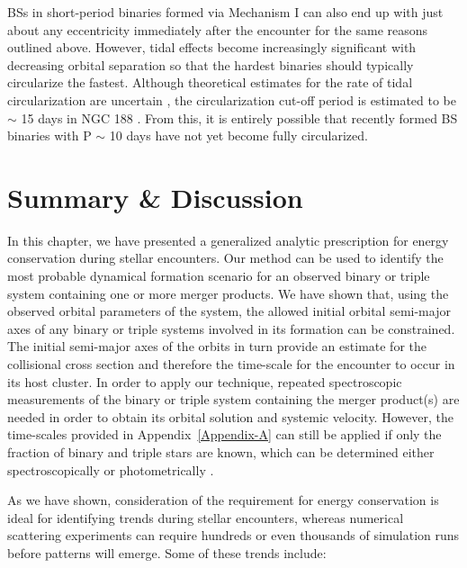 \begin{enumerate}
BSs in short-period binaries formed via Mechanism I can also end up
with just about any eccentricity immediately after the encounter for
the same reasons outlined above.  However, tidal effects become increasingly significant
with decreasing orbital separation so that the hardest binaries should
typically circularize the fastest.  Although theoretical estimates for
the rate of tidal circularization are uncertain \citep{meibom05},
the circularization cut-off period is estimated to be $\sim$ 15 days in NGC
188 \citep{mathieu04}.  From this, it is entirely possible that
recently formed BS 
binaries with P $\sim$ 10 days have not yet become fully
circularized.  

\end{enumerate}

\section{Summary \& Discussion} \label{discussion2}

In this chapter, we have presented a generalized analytic prescription
for energy conservation during stellar encounters.  Our method can be
used to identify the most probable
dynamical formation scenario for an observed binary or triple
system containing one or more merger products.  We have shown
that, using the observed 
orbital parameters of the system, the allowed initial orbital
semi-major axes of any binary or triple
systems involved in its formation can be constrained.  The
initial semi-major axes of the orbits in turn provide an 
estimate for the collisional cross section and therefore the time-scale
for the encounter to occur in its host cluster.  In order to apply our
technique, repeated spectroscopic measurements of the binary or triple
system containing the merger product(s) are needed in order to obtain
its orbital solution and systemic velocity.  
However, the time-scales provided in Appendix~\ref{Appendix-A} can still
be applied if only the fraction of binary and triple stars are known, 
which can be determined either spectroscopically
\citep[e.g.][]{mathieu90, latham05} or photometrically
\citep[e.g.][]{fan96}.

As we have shown, consideration of the requirement for energy
conservation is ideal for identifying trends during
stellar encounters, whereas 
numerical scattering experiments can require hundreds or even thousands of
simulation runs before patterns will emerge.  Some of these trends include: 

